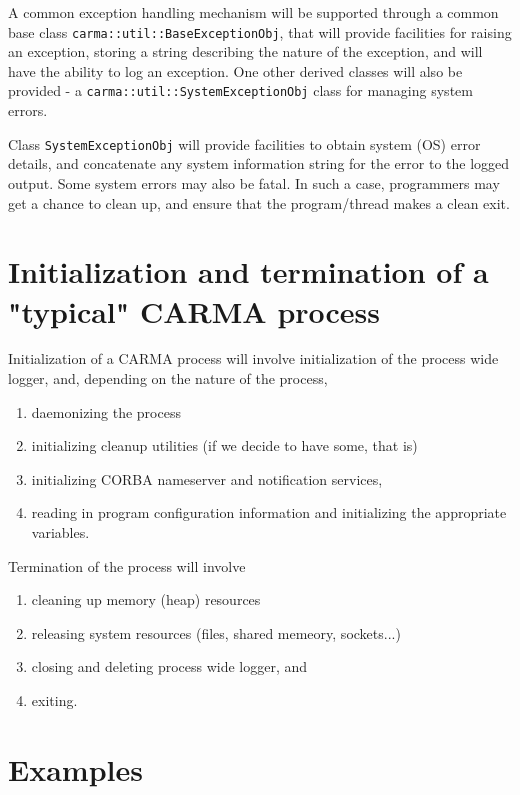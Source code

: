 \documentclass[preprint]{aastex} %
\begin{document}
A common exception handling mechanism will be supported through a common 
base class {\tt carma::util::BaseExceptionObj}, that will provide facilities 
for raising an exception, storing a string describing the nature of the 
exception, and will have the ability to log an exception. One other derived 
classes will also be provided - a {\tt carma::util::SystemExceptionObj}
class for managing system errors.

Class {\tt SystemExceptionObj} will provide facilities to obtain system (OS) 
error details, and concatenate any system information string for the 
error to the logged output. Some system errors may also be fatal. 
In such a case, programmers may get a chance to clean up, and ensure that
the program/thread makes a clean exit.


\section{Initialization and termination of a "typical" CARMA process}

Initialization of a CARMA process will involve initialization of the process
wide logger, and, depending on the nature of the process, 

\begin {enumerate}
\item daemonizing the process
\item initializing cleanup utilities (if we decide to have some, that is)
\item initializing CORBA nameserver and notification services, 
\item reading in program configuration information and initializing
the appropriate variables.
\end {enumerate}

Termination of the process will involve

\begin {enumerate}
\item cleaning up memory (heap) resources
\item releasing system resources (files, shared memeory, sockets...)
\item closing and deleting process wide logger, and
\item exiting.
\end {enumerate}

\section{Examples}
\end{document}

